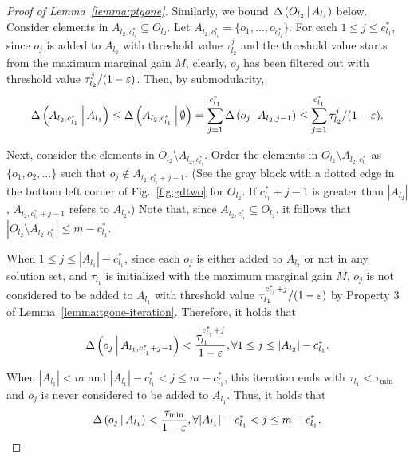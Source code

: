 \begin{proof}[Proof of Lemma~\ref{lemma:ptgone}]
Similarly, we bound $\Delta \left( O_{l_2} \, \middle| \, A_{l_1} \right)$ below.
Consider elements in $A_{l_2, c_{l_1}^*} \subseteq O_{l_2}$.
Let $A_{l_2, c_{l_1}^*} = \{o_1, \ldots, o_{c_{l_1}^*}\}$.
For each $1\le j \le c_{l_1}^*$, 
since $o_j$ is added to $A_{l_2}$ with threshold value $\tau_{l_2}^{j}$
and the threshold value starts from the maximum marginal gain $M$,
clearly, $o_j$ has been filtered out with threshold value $\tau_{l_2}^{j}/(1-\varepsilon)$.
Then, by submodularity,
\begin{equation}\label{inq:ptgone-case1-5}
\Delta \left( A_{l_2, c_{l_1}^*}  \, \middle| \, A_{l_1} \right) \le \Delta \left( A_{l_2, c_{l_1}^*}  \, \middle| \, \emptyset \right)
 = \sum_{j=1}^{c_{l_1}^*}\Delta \left( o_j \, \middle| \, A_{l_2, j-1} \right)
 \le \sum_{j=1}^{c_{l_1}^*} \tau_{l_2}^{j}/(1-\varepsilon).
\end{equation}

Next, consider the elements in $O_{l_2}\setminus A_{l_2, c_{l_1}^*}$.
Order the elements in $O_{l_2}\setminus A_{l_2, c_{l_1}^*}$ as $\{o_1, o_2, \ldots\}$ such that $o_j \not \in A_{l_2, c_{l_1}^*+j-1}$.
(See the gray block with a dotted edge in the bottom left corner of Fig.~\ref{fig:gdtwo} for $O_{l_2}$.
If $c_{l_1}^*+j-1$ is greater than $|A_{l_2}|$,
$A_{l_2, c_{l_1}^*+j-1}$ refers to $A_{l_2}$.)
Note that, since $A_{l_2, c_{l_1}^*} \subseteq O_{l_2}$,
it follows that $|O_{l_2}\setminus A_{l_2, c_{l_1}^*}| \le m - c_{l_1}^*$.

When $1 \le j \le |A_{l_1}|-c_{l_1}^*$,
since each $o_j$ is either added to $A_{l_2}$ or not in any solution set,
and $\tau_{l_1}$ is initialized with the maximum marginal gain $M$,
$o_j$ is not considered to be added to $A_{l_1}$ with threshold value $\tau_{l_1}^{c_{l_1}^* + j}/(1-\varepsilon)$
by Property 3 of Lemma~\ref{lemma:tgone-iteration}.
Therefore, it holds that 
\begin{equation}\label{inq:ptgone-case1-6}
\Delta \left( o_j \, \middle| \, A_{l_1, c_{l_1}^*+j-1} \right) < \frac{\tau_{l_1}^{c_{l_1}^* + j}}{1-\varepsilon} , \forall 1\le j\le |A_{l_2}|-c_{l_1}^*.
\end{equation}

When $|A_{l_1}| < m$ and $|A_{l_1}|-c_{l_1}^* < j\le m-c_{l_1}^*$,
this iteration ends with $\tau_{l_1} < \tau_{\min}$
and $o_j$ is never considered to be added to $A_{l_1}$.
Thus, it holds that
\begin{equation}\label{inq:ptgone-case1-7}
\Delta \left( o_j \, \middle| \, A_{l_1} \right) < \frac{\tau_{\min}}{1-\varepsilon}, \forall |A_{l_1}|-c_{l_1}^* < j \le m-c_{l_1}^*.
\end{equation}


\end{proof}
